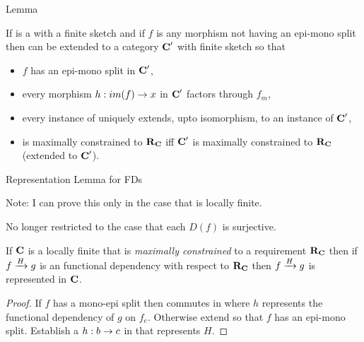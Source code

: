 \begin{frame}{Lemma}
\begin{lemma}
If \catcw is a \catMEterm with a finite sketch and if $f$ is any  morphism 
not having an epi-mono split then \catcw can be extended to a category $\catcp$ with finite sketch so that
\begin{itemize} 
\item $f$ has an epi-mono split in $\catcp$,
\item every morphism $h:im(f) \morph x$ in $\catcp$ factors through $f_m$,
\item every instance of \catcw uniquely extends, upto isomorphism, to an instance of $\catcp$,
\item \catcw is maximally constrained to $\reqtc$ iff $\catcp$ is maximally constrained to $\reqtc$ (extended to $\catcp$).
\end{itemize} 
\end{lemma} 
\end{frame}
\begin{frame}{Representation Lemma for FDs}
{\small Note: I can prove this only in the case that \catcw is locally finite.

No longer restricted to the case that each $D(f)$ is surjective.}

\begin{lemma}
If $\catc$ is a locally finite \catMEterm that is 
\textit{maximally constrained} to a requirement $\reqtc$ then
if $\fundep{H}{f}{g}$  is an   functional dependency with respect to $\reqtc$
then $\fundep{H}{f}{g}$ is represented in $\catc$.
\end{lemma}
\begin{proof} If $f$ has a mono-epi split then
 commutes in \catcw  where $h$ represents 
the functional dependency of $g$ on $f_e$.
Otherwise extend \catcw so that $f$ has an epi-mono split.
Establish a $h: b \morph c$ in \catcw that represents $H$.
\end{proof}
\end{frame}

